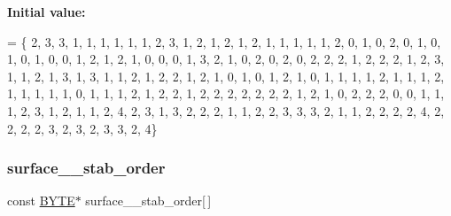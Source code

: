 {\bfseries Initial value\+:}
\begin{DoxyCode}
= \{ 2, 3, 3, 1, 1, 1, 1, 1, 1, 2, 
    3, 1, 2, 1, 2, 1, 2, 1, 1, 1, 
    1, 1, 2, 0, 1, 0, 2, 0, 1, 0, 
    1, 0, 1, 0, 0, 1, 2, 1, 2, 1, 
    0, 0, 0, 1, 3, 2, 1, 0, 2, 0, 
    2, 0, 2, 2, 2, 1, 2, 2, 2, 1, 
    2, 3, 1, 1, 2, 1, 3, 1, 3, 1, 
    1, 2, 1, 2, 2, 1, 2, 1, 0, 1, 
    0, 1, 2, 1, 0, 1, 1, 1, 1, 2, 
    1, 1, 1, 2, 1, 1, 1, 1, 1, 0, 
    1, 1, 1, 2, 1, 2, 2, 1, 2, 2, 
    2, 2, 2, 2, 2, 1, 2, 1, 0, 2, 
    2, 2, 0, 0, 1, 1, 1, 2, 3, 1, 
    2, 1, 1, 2, 4, 2, 3, 1, 3, 2, 
    2, 2, 1, 1, 2, 2, 3, 3, 3, 2, 
    1, 1, 2, 2, 2, 2, 4, 2, 2, 2, 
    2, 3, 2, 3, 2, 3, 3, 2, 4\}
\end{DoxyCode}
\mbox{\label{surface__47_8_c_a12eac70c2c8d947898ee581702a92e2b}} 
\subsubsection{\texorpdfstring{surface\+\_\+\_\+stab\+\_\+order}{surface\_47\_stab\_order}}
{\footnotesize\ttfamily const \mbox{\hyperlink{galois_8h_ab6cc7b4aeb6ea31aba2b3fbfc83ff5e6}{B\+Y\+TE}}$\ast$ surface\+\_\+\_\+stab\+\_\+order\mbox{[}$\,$\mbox{]}}

